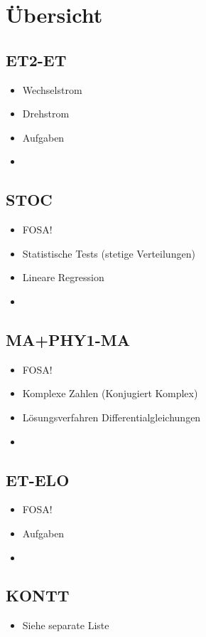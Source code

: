 
\section{Übersicht}

\subsection{ET2-ET}
\begin{itemize}
  \item Wechselstrom
  \item Drehstrom
  \item Aufgaben
  \item 
\end{itemize}

\subsection{STOC}
\begin{itemize}
  \item FOSA!
  \item Statistische Tests (stetige Verteilungen)
  \item Lineare Regression
  \item 
\end{itemize}

\subsection{MA+PHY1-MA}
\begin{itemize}
  \item FOSA!
  \item Komplexe Zahlen (Konjugiert Komplex)
  \item Lösungsverfahren Differentialgleichungen
  \item 
\end{itemize}

\subsection{ET-ELO}
\begin{itemize}
  \item FOSA! 
  \item Aufgaben
  \item 
\end{itemize}

\subsection{KONTT}
\begin{itemize}
  \item Siehe separate Liste
\end{itemize}


